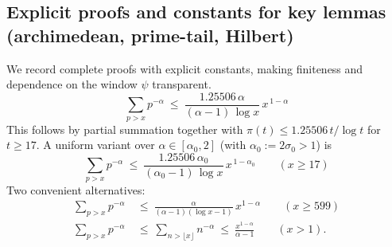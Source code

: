 \documentclass[11pt]{article}
\theoremstyle{definition}
\theoremstyle{remark}
\theoremstyle{definition}
\begin{document}
\subsection*{Explicit proofs and constants for key lemmas (archimedean, prime-tail, Hilbert)}
We record complete proofs with explicit constants, making finiteness and dependence on the window $\psi$ transparent.
\begin{equation}\label{eq:P1}
 \sum_{p>x} p^{-\alpha}\ \le\ \frac{1.25506\,\alpha}{(\alpha-1)\,\log x}\,x^{\,1-\alpha}
\end{equation}
This follows by partial summation together with $\pi(t)\le 1.25506\,t/\log t$ for $t\ge 17$. A uniform variant over $\alpha\in[\alpha_0,2]$ (with $\alpha_0:=2\sigma_0>1$) is
\begin{equation}\label{eq:P1uniform}
 \sum_{p>x} p^{-\alpha}\ \le\ \frac{1.25506\,\alpha_0}{(\alpha_0-1)\,\log x}\,x^{\,1-\alpha_0}\qquad(x\ge 17)
\end{equation}
Two convenient alternatives:
\begin{align}
 \sum_{p>x}p^{-\alpha}&\ \le\ \frac{\alpha}{(\alpha-1)(\log x-1)}\,x^{1-\alpha}\qquad(x\ge 599)\label{eq:P1dusart}\\
 \sum_{p>x}p^{-\alpha}&\ \le\ \sum_{n>\lfloor x\rfloor}n^{-\alpha}\ \le\ \frac{x^{1-\alpha}}{\alpha-1}\qquad(x>1).\label{eq:P1triv}
\end{align}
\end{document}
